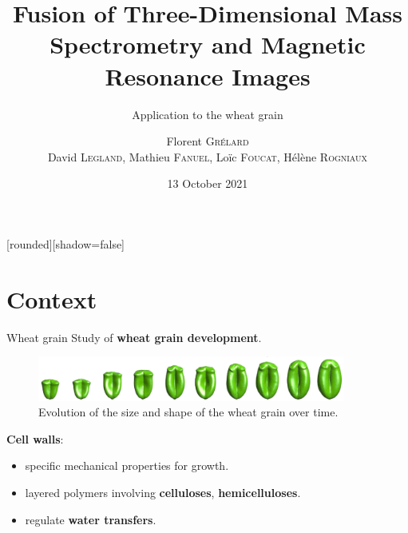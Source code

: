 \documentclass[10pt]{beamer}
\title{Fusion of Three-Dimensional Mass Spectrometry and Magnetic Resonance Images}
\subtitle{\normalsize Application to the wheat grain}
\institute{OurCon 2021}
\author{{Florent \textsc{Grélard}\\
    David \textsc{Legland}, Mathieu \textsc{Fanuel}, Loïc \textsc{Foucat}, Hélène \textsc{Rogniaux}}}
\begin{document}
[rounded][shadow=false]

\date{\vspace{0.2cm}13 October 2021} %



\makeatletter
\AtBeginPart{%
  \beamer@tocsectionnumber=0\relax
  \setcounter{section}{0}
}
\makeatother

\begin{frame}[plain]
  \titlepage
\end{frame}

\section{Context}
\begin{frame}{Wheat grain}
  Study of \textbf{wheat grain development}.

  \begin{figure}[ht]
    \centering
    \includegraphics[width=0.9\textwidth]{fig/stages}
    \caption{Evolution of the size and shape of the wheat grain over time.}
  \end{figure}

  
  \textbf{Cell walls}:
  \begin{itemize}
  \item specific mechanical properties for growth.
  \item layered polymers involving \textbf{celluloses}, \textbf{hemicelluloses}.
  \item regulate \textbf{water transfers}.
  \end{itemize}

  

\end{frame}
\end{document}
